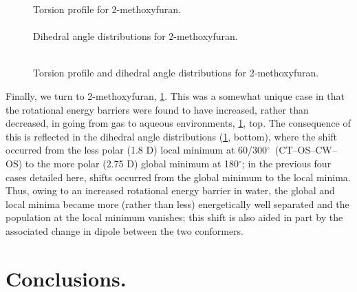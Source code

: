 \documentclass[12pt]{report}
\def\deg{$^{\circ}$}
\begin{document}
\begin{figure}[htbp]
\centering
Torsion profile for 2-methoxyfuran.\\
\\
Dihedral angle distributions for 2-methoxyfuran.\\
\\
\caption{Torsion profile and dihedral angle distributions for 2-methoxyfuran.}
\label{dihfomegb}
\end{figure}

Finally, we turn to 2-methoxyfuran, \cref{dihfomegb}. This was a somewhat unique case in that the rotational energy barriers were found to have increased, rather than decreased, in going from gas to aqueous environments, \cref{dihfomegb}, top. The consequence of this is reflected in the dihedral angle distributions (\cref{dihfomegb}, bottom), where the shift occurred from the less polar (1.8 D) local minimum at 60/300\deg\ (CT--OS--CW--OS) to the more polar (2.75 D) global minimum at 180\deg; in the previous four cases detailed here, shifts occurred from the global minimum to the local minima. Thus, owing to an increased rotational energy barrier in water, the global and local minima became more (rather than less) energetically well separated and the population at the local minimum vanishes; this shift is also aided in part by the associated change in dipole between the two conformers.




\section{Conclusions.}
\end{document}
